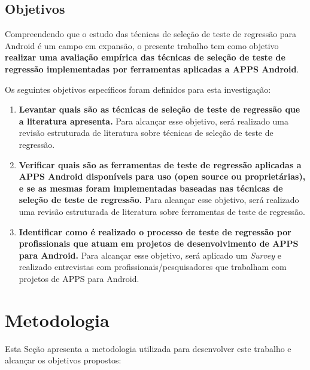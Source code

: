 \subsection{Objetivos}

Compreendendo que o estudo das técnicas de seleção de teste de regressão para Android é um campo em expansão, o presente trabalho tem como objetivo \textbf{realizar uma avaliação empírica das técnicas de seleção de teste de regressão implementadas por ferramentas aplicadas a \ac{APPS} Android}.

Os seguintes objetivos específicos foram definidos para esta investigação:

\begin{enumerate}[label=\bf O\arabic*,leftmargin=1.5cm]

    \item \textbf{Levantar quais são as técnicas de seleção de teste de regressão que a literatura apresenta.} Para alcançar esse objetivo, será realizado uma revisão estruturada de literatura sobre técnicas de seleção de teste de regressão.
    
    \item \textbf{Verificar quais são as ferramentas de teste de regressão aplicadas a \ac{APPS} Android disponíveis para uso (open source ou proprietárias), e se as mesmas foram implementadas baseadas nas técnicas de seleção de teste de regressão.} Para alcançar esse objetivo, será realizado uma revisão estruturada de literatura sobre ferramentas de teste de regressão.
    
    \item \textbf{Identificar como é realizado o processo de teste de regressão por profissionais que atuam em projetos de desenvolvimento de \ac{APPS} para Android.} Para alcançar esse objetivo, será aplicado um \textit{Survey} e realizado entrevistas com profissionais/pesquisadores que trabalham com projetos de \ac{APPS} para Android.

\end{enumerate}

\section{Metodologia}\label{sec:metodologia}

Esta Seção apresenta a metodologia utilizada para desenvolver este trabalho e alcançar os objetivos propostos:


